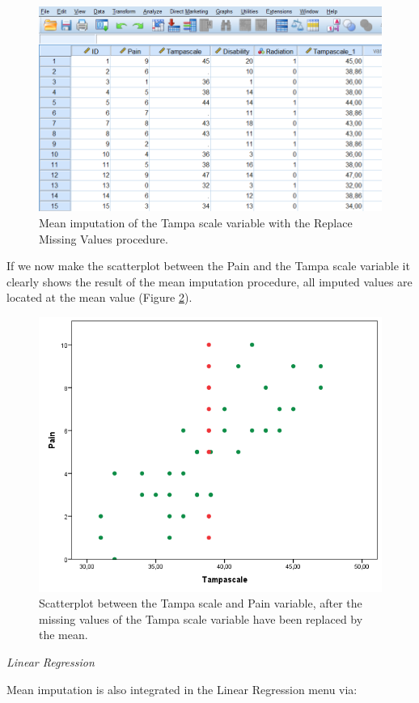 \documentclass[]{book}
\begin{document}
\begin{figure}

{\centering \includegraphics[width=0.7\linewidth]{images/fig3.7} 

}

\caption{Mean imputation of the Tampa scale variable with the Replace Missing Values procedure.}\label{fig:fig3-7}
\end{figure}

If we now make the scatterplot between the Pain and the Tampa scale
variable it clearly shows the result of the mean imputation procedure,
all imputed values are located at the mean value (Figure
\ref{fig:fig3-4}).

\begin{figure}

{\centering \includegraphics[width=0.7\linewidth]{images/fig3.4} 

}

\caption{Scatterplot between the Tampa scale and Pain variable, after the missing values of the Tampa scale variable have been replaced by the mean.}\label{fig:fig3-4}
\end{figure}

\emph{Linear Regression}

Mean imputation is also integrated in the Linear Regression menu via:
\end{document}
